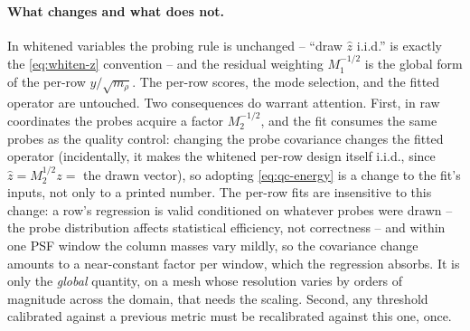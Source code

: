 \documentclass[11pt]{article}
\newcommand{\Mone}{M_1}
\newcommand{\Mtwo}{M_2}
\newcommand{\what}[1]{\widehat{#1}}
\begin{document}
\paragraph{What changes and what does not.} In whitened variables the probing
rule is unchanged -- ``draw $\what z$ i.i.d.'' is exactly the
\eqref{eq:whiten-z} convention -- and the residual weighting $\Mone^{-1/2}$ is
the global form of the per-row $y/\sqrt{m_\rho}$. The per-row scores, the mode
selection, and the fitted operator are untouched. Two consequences do warrant
attention. First, in raw coordinates the probes acquire a factor
$\Mtwo^{-1/2}$, and the fit consumes the same probes as the quality control:
changing the probe covariance changes the fitted operator (incidentally, it
makes the whitened per-row design itself i.i.d., since
$\what z = \Mtwo^{1/2} z = $ the drawn vector), so adopting
\eqref{eq:qc-energy} is a change to the fit's inputs, not only to a printed
number. The per-row fits are insensitive to this change: a row's regression
is valid conditioned on whatever probes were drawn -- the probe distribution
affects statistical efficiency, not correctness -- and within one PSF window
the column masses vary mildly, so the covariance change amounts to a
near-constant factor per window, which the regression absorbs. It is only
the \emph{global} quantity, on a mesh whose resolution varies by orders of
magnitude across the domain, that needs the scaling. Second, any threshold
calibrated against a previous metric must be recalibrated against this one,
once.
\end{document}
